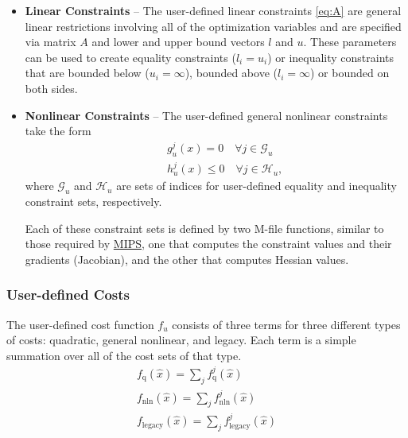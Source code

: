 \documentclass[12pt]{article}
\newcommand{\mips}[0]{{MIPS}}
\newcommand{\mipsurl}[0]{https://github.com/MATPOWER/mips}
\newcommand{\mipslink}[0]{\href{\mipsurl}{\mips{}}}
\numberwithin{equation}{section}
\numberwithin{table}{section}
\numberwithin{figure}{section}
\begin{document}
\begin{itemize}
\item {\bf Linear Constraints} -- The user-defined linear constraints \eqref{eq:A} are general linear restrictions involving all of the optimization variables and are specified via matrix $A$ and lower and upper bound vectors $l$ and $u$. These parameters can be used to create equality constraints ($l_i = u_i$) or inequality constraints that are bounded below ($u_i = \infty$), bounded above ($l_i = \infty$) or bounded on both sides.
\item {\bf Nonlinear Constraints} -- The user-defined general nonlinear constraints take the form
\begin{eqnarray}
&& g_u^j(x) = 0 \quad \forall{j} \in \mathcal{G}_u \label{eq:usereq} \\
&& h_u^j(x) \le 0 \quad \forall{j} \in \mathcal{H}_u, \label{eq:userieq}
\end{eqnarray}
where $\mathcal{G}_u$ and $\mathcal{H}_u$ are sets of indices for user-defined equality and inequality constraint sets, respectively.

Each of these constraint sets is defined by two M-file functions, similar to those required by \mipslink{}, one that computes the constraint values and their gradients (Jacobian), and the other that computes Hessian values.
\end{itemize}

\subsubsection{User-defined Costs}
\label{sec:user_costs}

The user-defined cost function $f_u$ consists of three terms for three different types of costs: quadratic, general nonlinear, and legacy. Each term is a simple summation over all of the cost sets of that type.
\begin{eqnarray}
& f_\mathrm{q}(\hat{x}) = \sum_j f^j_\mathrm{q}(\hat{x}) & \\
& f_\mathrm{nln}(\hat{x}) = \sum_j f^j_\mathrm{nln}(\hat{x}) & \\
& f_\mathrm{legacy}(\hat{x}) = \sum_j f^j_\mathrm{legacy}(\hat{x}) &
\label{eq:fu}
\end{eqnarray}
\end{document}
